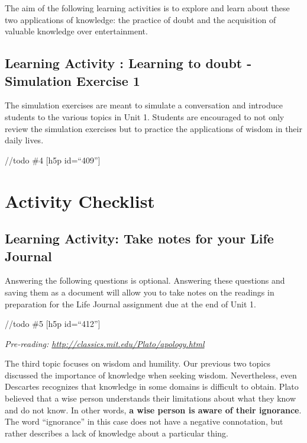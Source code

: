 \documentclass[
]{book}
\begin{document}
The aim of the following learning activities is to explore and learn about these two applications of knowledge: the practice of doubt and the acquisition of valuable knowledge over entertainment.

\hypertarget{learning-activity-learning-to-doubt---simulation-exercise-1}{%
\subsection{Learning Activity : Learning to doubt - Simulation Exercise 1}\label{learning-activity-learning-to-doubt---simulation-exercise-1}}

The simulation exercises are meant to simulate a conversation and introduce students to the various topics in Unit 1. Students are encouraged to not only review the simulation exercises but to practice the applications of wisdom in their daily lives.

//todo \#4
{[}h5p id=``409''{]}

\hypertarget{activity-checklist}{%
\section*{Activity Checklist}\label{activity-checklist}}

\begin{reflect}
\hypertarget{learning-activity-take-notes-for-your-life-journal-1}{%
\subsection{Learning Activity: Take notes for your Life Journal}\label{learning-activity-take-notes-for-your-life-journal-1}}

Answering the following questions is optional. Answering these questions and saving them as a document will allow you to take notes on the readings in preparation for the Life Journal assignment due at the end of Unit 1.
\end{reflect}

//todo \#5
{[}h5p id=``412''{]}

\emph{Pre-reading: \url{http://classics.mit.edu/Plato/apology.html}}

The third topic focuses on wisdom and humility. Our previous two topics discussed the importance of knowledge when seeking wisdom. Nevertheless, even Descartes recognizes that knowledge in some domains is difficult to obtain. Plato believed that a wise person understands their limitations about what they know and do not know. In other words, \textbf{a wise person is aware of their ignorance}. The word ``ignorance'' in this case does not have a negative connotation, but rather describes a lack of knowledge about a particular thing.
\end{document}
